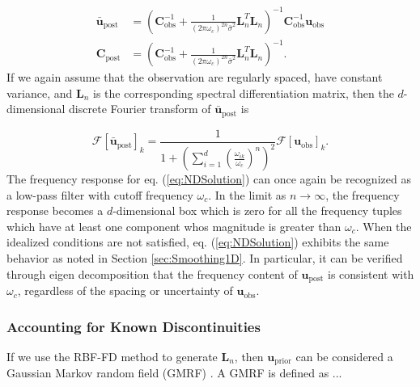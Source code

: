 \documentclass[10pt,a4paper]{article}
\begin{document}
\begin{equation}\label{eq:NDSolution}
\begin{split}
\mathbf{\bar{u}}_\mathrm{post} &= (\mathbf{C}_\mathrm{obs}^{-1} +   
                   \frac{1}{(2\pi\omega_c)^{2n}\bar{\sigma}^2}\mathbf{L}_n^T\mathbf{L}_n)^{-1}\mathbf{C}_\mathrm{obs}^{-1}
                   \mathbf{u}_\mathrm{obs}
\\
\mathbf{C}_\mathrm{post} &= (\mathbf{C}_\mathrm{obs}^{-1} +   
                            \frac{1}{(2\pi\omega_c)^{2n}\bar{\sigma}^2}\mathbf{L}_n^T\mathbf{L}_n)^{-1}.
\end{split}
\end{equation}
If we again assume that the observation are regularly spaced, have constant variance, and $\mathbf{L}_n$ is the corresponding spectral differentiation matrix, then the $d$-dimensional discrete Fourier transform of $\mathbf{\bar{u}}_\mathrm{post}$ is 

\begin{equation}\label{eq:NDFourierSoln}
  \mathcal{F}\left[\mathbf{\bar{u}}_\mathrm{post}\right]_k = 
  \frac{1}{1 + \left(\sum_{i=1}^d \left(\frac{\omega_{ik}}{\omega_c}\right)^n\right)^2} \mathcal{F}\left[\mathbf{u}_\mathrm{obs}\right]_k.
\end{equation}
The frequency response for eq. (\ref{eq:NDSolution}) can once again be recognized as a low-pass filter with cutoff frequency $\omega_c$.  In the limit as $n \to \infty$, the frequency response becomes a $d$-dimensional box which is zero for all the frequency tuples which have at least one component whos magnitude is greater than $\omega_c$. 
When the idealized conditions are not satisfied, eq. (\ref{eq:NDSolution}) exhibits the same behavior as noted in Section \ref{sec:Smoothing1D}. In particular, it can be verified through eigen decomposition that the frequency content of $\mathbf{u}_\mathrm{post}$ is consistent with $\omega_c$, regardless of the spacing or uncertainty of $\mathbf{u}_\mathrm{obs}$.
   
\subsubsection{Accounting for Known Discontinuities}

If we use the RBF-FD method to generate $\mathbf{L}_n$, then $\mathbf{u}_\mathrm{prior}$ can be considered a Gaussian Markov random field (GMRF) \citep[e.g.][]{Rue2005}.  A GMRF is defined as ...
\end{document}
